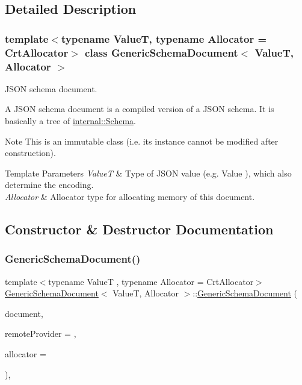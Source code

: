 \subsection{Detailed Description}
\subsubsection*{template$<$typename ValueT, typename Allocator = Crt\+Allocator$>$\newline
class Generic\+Schema\+Document$<$ Value\+T, Allocator $>$}

J\+S\+ON schema document. 

A J\+S\+ON schema document is a compiled version of a J\+S\+ON schema. It is basically a tree of \hyperlink{a02356}{internal\+::\+Schema}.

\begin{DoxyNote}{Note}
This is an immutable class (i.\+e. its instance cannot be modified after construction). 
\end{DoxyNote}

\begin{DoxyTemplParams}{Template Parameters}
{\em ValueT} & Type of J\+S\+ON value (e.\+g. {\ttfamily Value} ), which also determine the encoding. \\
\hline
{\em Allocator} & Allocator type for allocating memory of this document. \\
\hline
\end{DoxyTemplParams}


\subsection{Constructor \& Destructor Documentation}
\mbox{\label{a02240_a5577c9b9a7a898207a50db891388231c}} 
\subsubsection{\texorpdfstring{Generic\+Schema\+Document()}{GenericSchemaDocument()}}
{\footnotesize\ttfamily template$<$typename ValueT , typename Allocator  = Crt\+Allocator$>$ \\
\hyperlink{a02240}{Generic\+Schema\+Document}$<$ ValueT, Allocator $>$\+::\hyperlink{a02240}{Generic\+Schema\+Document} (\begin{DoxyParamCaption}\item[{const Value\+Type \&}]{document,  }\item[{\hyperlink{a02236}{I\+Remote\+Schema\+Document\+Provider\+Type} $\ast$}]{remote\+Provider = {},  }\item[{Allocator $\ast$}]{allocator = {} }\end{DoxyParamCaption})\hspace{0.3cm}{\ttfamily [inline]}, {\ttfamily [explicit]}}



